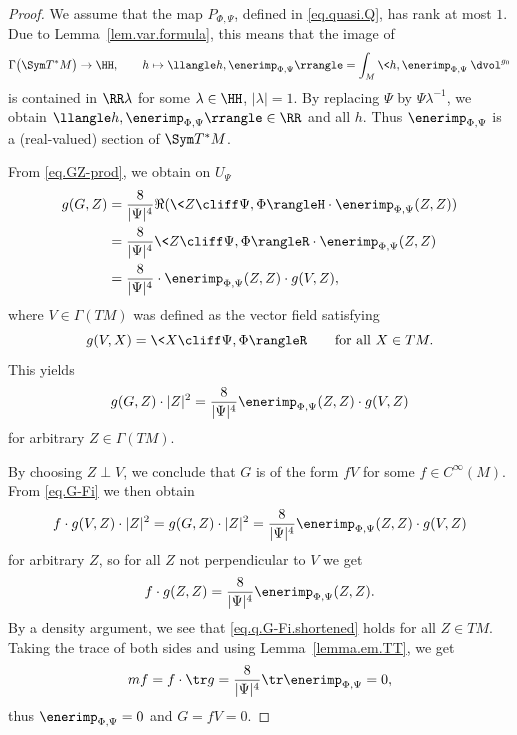 \begin{proof} %
We assume that the map $P_{\Phi,\Psi}$, defined in \eqref{eq.quasi.Q}, has rank at most $1$.
Due to Lemma~\ref{lem.var.formula}, this means that the image of
\[
\Gamma\bigl(\Sym T^*M\bigr)\to \HH, \qquad h\mapsto \llangle h,\enerimp_{\Phi,\Psi}\rrangle
= \int_M\<h,\enerimp_{\Phi,\Psi}\> \dvol^{g_0}
\]
is contained in $\RR \lambda$ for some $\lambda\in \HH$, $|\lambda|=1$. By replacing $\Psi$ by $\Psi \lambda^{-1}$, we obtain $\llangle h,\enerimp_{\Phi,\Psi}\rrangle\in \RR$ and all $h$. Thus $\enerimp_{\Phi,\Psi}$ is a (real-valued) section of $\Sym T^*M$.

From \eqref{eq.GZ-prod}, we obtain on $U_\Psi$
\begin{align*}
g(G, Z)
&=
\frac{8}{|\Psi|^4} \Re (\< Z \cliff \Psi , \Phi \rangleH\cdot \enerimp_{\Phi,\Psi}(Z,Z))\\
&=
\frac{8}{|\Psi|^4} \< Z \cliff \Psi , \Phi \rangleR \cdot \enerimp_{\Phi,\Psi}(Z,Z)\\
&=
\frac{8}{|\Psi|^4} \cdot \enerimp_{\Phi,\Psi}(Z,Z)\cdot g(V,Z) ,
\end{align*}
where $V\in \Gamma(TM)$ was defined as the vector field satisfying
\begin{equation*}%
g(V,X) = \<X\cliff \Psi,\Phi\rangleR\qquad \text{for all } X\in TM.
\end{equation*}
This yields
\begin{equation} \label{eq.G-Fi}
g(G, Z) \cdot |Z|^2 = \frac{8}{|\Psi|^4} \enerimp_{\Phi,\Psi}(Z,Z) \cdot g(V,Z)
\end{equation}
for arbitrary $Z\in \Gamma(TM)$.

By choosing $Z\perp V$, we conclude that $G$ is of the form $fV$ for some $f\in C^\infty(M)$.
From \eqref{eq.G-Fi} we then obtain
\begin{equation*}
f\cdot g(V,Z) \cdot |Z|^2 = g(G, Z) \cdot |Z|^2 =\frac{8}{|\Psi|^4} \enerimp_{\Phi,\Psi}(Z,Z) \cdot g(V,Z)
\end{equation*}
for arbitrary $Z$, so for all $Z$ not perpendicular to $V$ we get
\begin{equation}\label{eq.q.G-Fi.shortened}
f \cdot g(Z,Z) = \frac{8}{|\Psi|^4} \enerimp_{\Phi,\Psi}(Z,Z).
\end{equation}
By a density argument, we see that \eqref{eq.q.G-Fi.shortened} holds for all $Z\in TM$. Taking the trace of both sides and using Lemma~\ref{lemma.em.TT}, we get{\samepage
\[
mf = f \cdot \tr g = \frac{8}{|\Psi|^4} \tr \enerimp_{\Phi,\Psi}=0,
\]
thus $\enerimp_{\Phi,\Psi} = 0$ and $G=fV=0$.}


\end{proof}

